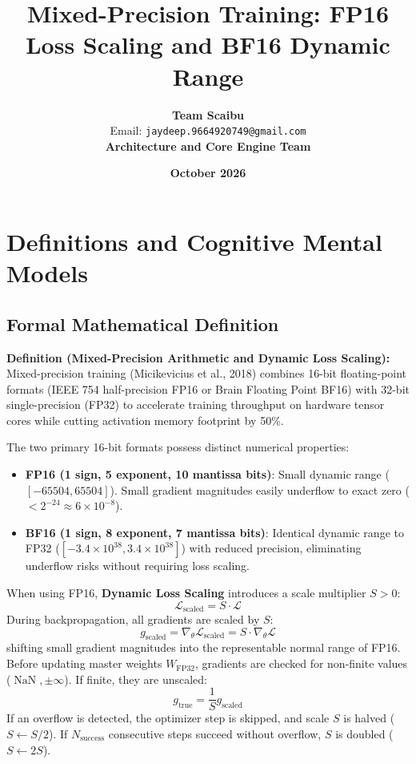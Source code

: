 \documentclass[11pt,a4paper]{article}
\title{\textbf{Mixed-Precision Training: FP16 Loss Scaling and BF16 Dynamic Range}}
\author{\textbf{Team Scaibu} \\ \small Email: \texttt{jaydeep.9664920749@gmail.com} \\ \small \textbf{Architecture and Core Engine Team}}
\date{\textbf{October 2026}}
\theoremstyle{definition}
\begin{document}
\maketitle

\section{Definitions and Cognitive Mental Models}

\subsection{Formal Mathematical Definition}
\textbf{Definition (Mixed-Precision Arithmetic and Dynamic Loss Scaling):}
Mixed-precision training (Micikevicius et al., 2018) combines 16-bit floating-point formats (IEEE 754 half-precision FP16 or Brain Floating Point BF16) with 32-bit single-precision (FP32) to accelerate training throughput on hardware tensor cores while cutting activation memory footprint by 50\%.

The two primary 16-bit formats possess distinct numerical properties:
\begin{itemize}
    \item \textbf{FP16 (1 sign, 5 exponent, 10 mantissa bits)}: Small dynamic range ($[-65504, 65504]$). Small gradient magnitudes easily underflow to exact zero ($< 2^{-24} \approx 6 \times 10^{-8}$).
    \item \textbf{BF16 (1 sign, 8 exponent, 7 mantissa bits)}: Identical dynamic range to FP32 ($[-3.4 \times 10^{38}, 3.4 \times 10^{38}]$) with reduced precision, eliminating underflow risks without requiring loss scaling.
\end{itemize}

When using FP16, \textbf{Dynamic Loss Scaling} introduces a scale multiplier $S > 0$:
{\boldmath
\begin{equation}
\mathcal{L}_{\text{scaled}} = S \cdot \mathcal{L}
\end{equation}
}
During backpropagation, all gradients are scaled by $S$:
{\boldmath
\begin{equation}
g_{\text{scaled}} = \nabla_\theta \mathcal{L}_{\text{scaled}} = S \cdot \nabla_\theta \mathcal{L}
\end{equation}
}
shifting small gradient magnitudes into the representable normal range of FP16. Before updating master weights $W_{\text{FP32}}$, gradients are checked for non-finite values ($\operatorname{NaN}, \pm\infty$). If finite, they are unscaled:
{\boldmath
\begin{equation}
g_{\text{true}} = \frac{1}{S} g_{\text{scaled}}
\end{equation}
}
If an overflow is detected, the optimizer step is skipped, and scale $S$ is halved ($S \gets S / 2$). If $N_{\text{success}}$ consecutive steps succeed without overflow, $S$ is doubled ($S \gets 2S$).
\end{document}
